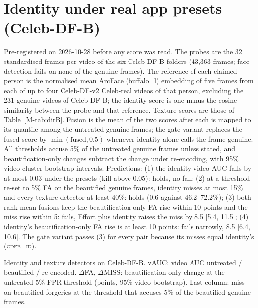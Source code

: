 \documentclass[10pt]{article}
\begin{document}
\section{Identity under real app presets (Celeb-DF-B)}
\label{sec:cdfbid}
Pre-registered on 2026-10-28 before any score was read. The probes are the 32 standardised frames per video of
the six Celeb-DF-B folders (43,363 frames; face detection fails on none of the genuine frames). The reference of each claimed
person is the normalised mean ArcFace (buffalo\_l) embedding of five frames from each of up to four Celeb-DF-v2 Celeb-real
videos of that person, excluding the 231 genuine videos of Celeb-DF-B; the identity score is one minus the cosine similarity
between the probe and that reference. Texture
scores are those of Table~\ref{M-tab:dirB}. Fusion is the mean of the two scores after each is mapped to its quantile among
the untreated genuine frames; the gate variant replaces the fused score by $\min(\text{fused}, 0.5)$ whenever identity alone
calls the frame genuine. All thresholds accuse 5\% of the untreated genuine frames unless stated, and beautification-only
changes subtract the change under re-encoding, with 95\% video-cluster bootstrap intervals. Predictions: (1) the identity video
AUC falls by at most 0.03 under the presets (kill above 0.05): holds, no fall; (2) at a threshold re-set to 5\% FA on the
beautified genuine frames, identity misses at most 15\% and every texture detector at least 40\%: holds (0.6 against
46.2--72.2\%); (3) both rank-mean fusions keep the beautification-only FA rise within 10 points and the miss rise within 5:
fails, Effort plus identity raises the miss by 8.5 [5.4, 11.5]; (4) identity's beautification-only FA rise is at least 10
points: fails narrowly, 8.5 [6.4, 10.6]. The gate variant passes (3) for every pair because its misses equal identity's
(\textsc{cdfb\_id}).
\begin{table}[H]
\centering
\caption{Identity and texture detectors on Celeb-DF-B. vAUC: video AUC untreated / beautified / re-encoded.
$\Delta$FA, $\Delta$MISS: beautification-only change at the untreated 5\%-FPR threshold (points, 95\% video-bootstrap). Last
column: miss on beautified forgeries at the threshold that accuses 5\% of the beautified genuine frames.}
\label{tab:cdfbid}
\scriptsize
\begin{adjustbox}{max width=\linewidth}\end{adjustbox}
\end{table}
\end{document}
